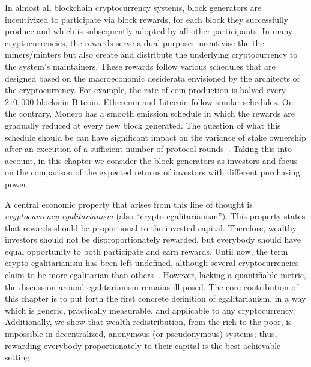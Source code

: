 In almost all blockchain cryptocurrency systems, block generators are
incentivized to participate via block rewards, \ie for each block they
successfully produce and which is subsequently adopted by all other
participants. In many cryptocurrencies, the rewards serve a dual purpose:
incentivise the the miners/minters but also create and distribute the
underlying cryptocurrency to the system's maintainers. These rewards follow
various schedules that are designed based on the macroeconomic desiderata
envisioned by the architects of the cryptocurrency. For example, the rate of
coin production is halved every $210,000$ blocks in Bitcoin. Ethereum and
Litecoin follow similar schedules.  On the contrary, Monero has a smooth
emission schedule in which the rewards are gradually reduced at every new block
generated. The question of what this schedule should be can have significant
impact on the variance of stake ownership after an execution of a sufficient
number of protocol rounds~\cite{FC:FKORVW19}. Taking this into account, in this
chapter we consider the block generators as investors and focus on the
comparison of the expected returns of investors with different purchasing
power.

A central economic property that arises from this line of thought is
\emph{cryptocurrency egalitarianism} (also ``crypto-egalitarianism''). This
property states that rewards should be proportional to the invested capital.
Therefore, wealthy investors should not be disproportionately rewarded, but
everybody should have equal opportunity to both participate and earn rewards.
Until now, the term crypto-egalitarianism has been left undefined, although
several cryptocurrencies claim to be more egalitarian than
others~\cite{van2013cryptonote,mcmillan2013}. However, lacking a quantifiable
metric, the discussion around egalitarianism remains ill-posed.  The core
contribution of this chapter is to put forth the first concrete definition of
egalitarianism, in a way which is generic, practically measurable, and
applicable to any cryptocurrency. Additionally, we show that wealth
redistribution, from the rich to the poor, is impossible in decentralized,
anonymous (or pseudonymous) systems; thus, rewarding everybody proportionately
to their capital is the best achievable setting.

